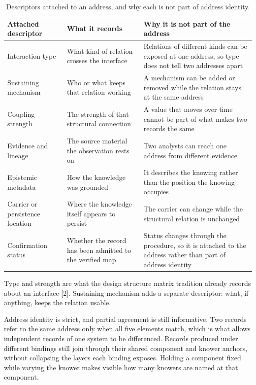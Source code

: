 \documentclass[preprints,article,submit,moreauthors]{Definitions/mdpi}
\begin{document}
\begin{table}[H]
\caption{Descriptors attached to an address, and why each is not part of address identity.}
\label{tab:descriptors}
\centering
\scriptsize
\begin{tabularx}{\textwidth}{W{0.78}W{1.17}W{1.05}}
\hline
\textbf{Attached descriptor} & \textbf{What it records} & \textbf{Why it is not part of the address} \\
\hline
Interaction type & What kind of relation crosses the interface & Relations of different kinds can be exposed at one address, so type does not tell two addresses apart \\
Sustaining mechanism & Who or what keeps that relation working & A mechanism can be added or removed while the relation stays at the same address \\
Coupling strength & The strength of that structural connection & A value that moves over time cannot be part of what makes two records the same \\
Evidence and lineage & The source material the observation rests on & Two analysts can reach one address from different evidence \\
Epistemic metadata & How the knowledge was grounded & It describes the knowing rather than the position the knowing occupies \\
Carrier or persistence location & Where the knowledge itself appears to persist & The carrier can change while the structural relation is unchanged \\
Confirmation status & Whether the record has been admitted to the verified map & Status changes through the procedure, so it is attached to the address rather than part of address identity \\
\hline
\end{tabularx}
\end{table}

Type and strength are what the design structure matrix tradition already records about an interface [2]. Sustaining mechanism adds a separate descriptor: what, if anything, keeps the relation usable.

Address identity is strict, and partial agreement is still informative. Two records refer to the same address only when all five elements match, which is what allows independent records of one system to be differenced. Records produced under different bindings still join through their shared component and knower anchors, without collapsing the layers each binding exposes. Holding a component fixed while varying the knower makes visible how many knowers are named at that component.
\end{document}
